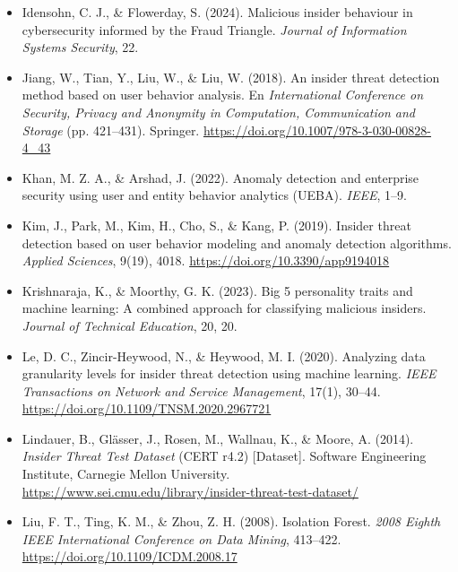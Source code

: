 \documentclass[IB]{TFUOC}%
\begin{document}
\begin{itemize}
    \item Idensohn, C. J., \& Flowerday, S. (2024). Malicious insider behaviour 
    in cybersecurity informed by the Fraud Triangle. \textit{Journal of 
    Information Systems Security}, 22.

    \item Jiang, W., Tian, Y., Liu, W., \& Liu, W. (2018). An insider threat 
    detection method based on user behavior analysis. En \textit{International 
    Conference on Security, Privacy and Anonymity in Computation, Communication 
    and Storage} (pp. 421--431). Springer. 
    \url{https://doi.org/10.1007/978-3-030-00828-4_43}

    \item Khan, M. Z. A., \& Arshad, J. (2022). Anomaly detection and 
    enterprise security using user and entity behavior analytics (UEBA). 
    \textit{IEEE}, 1--9.

    \item Kim, J., Park, M., Kim, H., Cho, S., \& Kang, P. (2019). Insider 
    threat detection based on user behavior modeling and anomaly detection 
    algorithms. \textit{Applied Sciences}, 9(19), 4018. 
    \url{https://doi.org/10.3390/app9194018}

    \item Krishnaraja, K., \& Moorthy, G. K. (2023). Big 5 personality traits 
    and machine learning: A combined approach for classifying malicious 
    insiders. \textit{Journal of Technical Education}, 20, 20.

    \item Le, D. C., Zincir-Heywood, N., \& Heywood, M. I. (2020). Analyzing 
    data granularity levels for insider threat detection using machine learning. 
    \textit{IEEE Transactions on Network and Service Management}, 17(1), 
    30--44. \url{https://doi.org/10.1109/TNSM.2020.2967721}

    \item Lindauer, B., Glässer, J., Rosen, M., Wallnau, K., \& Moore, A. 
    (2014). \textit{Insider Threat Test Dataset} (CERT r4.2) [Dataset]. 
    Software Engineering Institute, Carnegie Mellon University. 
    \url{https://www.sei.cmu.edu/library/insider-threat-test-dataset/}

    \item Liu, F. T., Ting, K. M., \& Zhou, Z. H. (2008). Isolation Forest. 
    \textit{2008 Eighth IEEE International Conference on Data Mining}, 
    413--422. \url{https://doi.org/10.1109/ICDM.2008.17}


\end{itemize}
\end{document}
